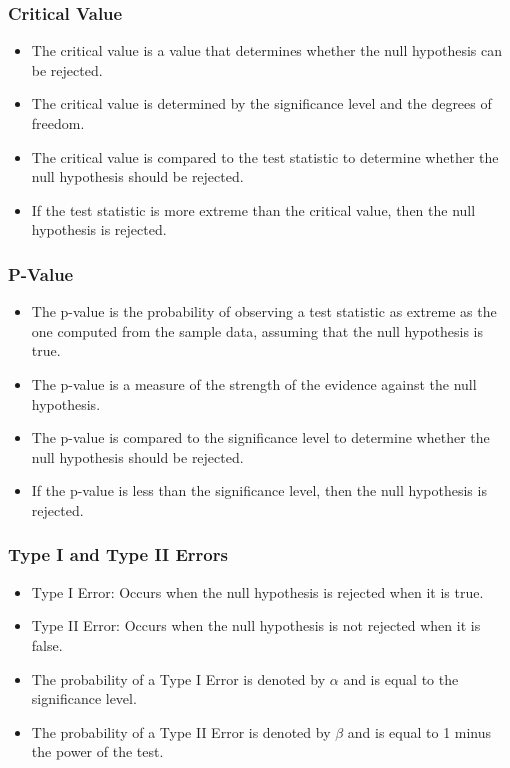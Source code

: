 \documentclass[serif, 9pt, aspectratio=32]{beamer}
\begin{document}
\begin{frame}
    \frametitle{Critical Value}
    \begin{itemize}
        \setlength{\itemsep}{2em}
        \item The critical value is a value that determines whether the null hypothesis can be rejected.
        \item The critical value is determined by the significance level and the degrees of freedom.
        \item The critical value is compared to the test statistic to determine whether the null hypothesis should be rejected.
        \item If the test statistic is more extreme than the critical value, then the null hypothesis is rejected.
    \end{itemize}
\end{frame}

\begin{frame}
    \frametitle{P-Value}
    \begin{itemize}
        \setlength{\itemsep}{2em}
        \item The p-value is the probability of observing a test statistic as extreme as the one computed from the sample data, assuming that the null hypothesis is true.
        \item The p-value is a measure of the strength of the evidence against the null hypothesis.
        \item The p-value is compared to the significance level to determine whether the null hypothesis should be rejected.
        \item If the p-value is less than the significance level, then the null hypothesis is rejected.
    \end{itemize}
\end{frame}

\begin{frame}
    \frametitle{Type I and Type II Errors}
    \begin{itemize}
        \setlength{\itemsep}{2em}
        \item Type I Error: Occurs when the null hypothesis is rejected when it is true.
        \item Type II Error: Occurs when the null hypothesis is not rejected when it is false.
        \item The probability of a Type I Error is denoted by $\alpha$ and is equal to the significance level.
        \item The probability of a Type II Error is denoted by $\beta$ and is equal to 1 minus the power of the test.
    \end{itemize}
\end{frame}
\end{document}
